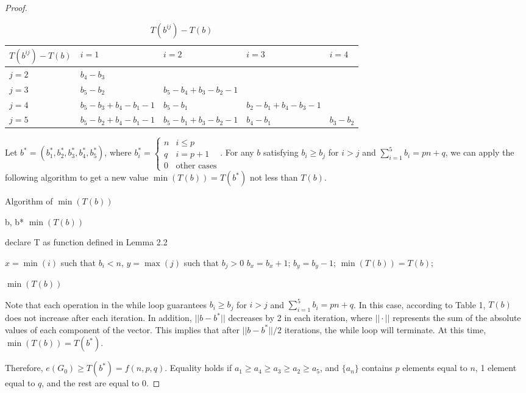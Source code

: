 \documentclass[11pt, oneside]{article}   	%
\begin{document}
\begin{proof}
\begin{table}[htb]
\begin{tabular}{|l|l|l|l|l|}
\hline
$T(b^{i j})-T(b)$ & $i=1$                & $i=2$                & $i=3$                & $i=4$      \\ \hline
$j=2$  & $b_4-b_3$           &                  &                      &            \\ \hline
$j=3$   & $b_5-b_2$           & $b_5-b_4+b_3-b_2-1$ &                  &            \\ \hline
$j=4$   & $b_5-b_3+b_4-b_1-1$ & $b_5-b_1$           & $b_2-b_1+b_4-b_3-1$ &         \\ \hline
$j=5$   & $b_5-b_2+b_4-b_1-1$ & $b_5-b_1+b_3-b_2-1$ & $b_4-b_1$           & $b_3-b_2$ \\ \hline
\end{tabular}
\caption{$T(b^{i j})-T(b)$}
\end{table}

Let $b^*=(b_1^{*},b_2^{*},b_3^{*},b_4^{*},b_5^{*})$, where $b_i^*=\begin{cases} n & i\leq p\\ q & i=p+1 \\ 0 & \text{other cases}\end{cases}$. For any $b$ satisfying $b_i\geq b_j$ for $i>j$ and $\sum\limits_{i=1}^5 b_i=pn+q$, we can apply the following algorithm to get a new value $\min(T(b))=T(b^*)$ not less than $T(b)$.
\begin{algorithm}[H]
    \caption{Algorithm of $\min(T(b))$}
    \label{alg:AOS}
    \renewcommand{\algorithmicrequire}{\textbf{Input:}}
    \renewcommand{\algorithmicensure}{\textbf{Output:}}
    \begin{algorithmic}[1]
        \REQUIRE b, b*   %
        \ENSURE $\min(T(b))$    %
        
        \STATE declare T as function defined in Lemma 2.2
        
            \STATE $x = \min(i)$ such that $b_i< n$, $y = \max(j)$ such that $b_j>0$
                \STATE $b_x=b_x+1$; $b_y=b_y-1$; $\min(T(b))=T(b)$;
            \ENDIF
        \ENDWHILE
        
        \RETURN $\min(T(b))$
    \end{algorithmic}
\end{algorithm}

Note that each operation in the while loop guarantees $b_i \geq b_j$ for $i > j$ and $\sum_{i=1}^5 b_i = p n + q $. In this case, according to Table 1, $T(b)$ does not increase after each iteration. In addition, $|| b - b^* ||$ decreases by 2 in each iteration, where $|| \cdot ||$ represents the sum of the absolute values of each component of the vector. This implies that after $|| b - b^* ||/2$  iterations, the while loop will terminate. At this time, $\min(T(b))=T(b^*)$.

Therefore, $e(G_0)\geq T(b^*)=f(n,p,q)$. Equality holds if $a_1\geq a_4\geq a_3\geq a_2\geq a_5$, and $\{a_n\}$ contains $p$ elements equal to $n$, 1 element equal to $q$, and the rest are equal to 0.
\end{proof}
\end{document}

